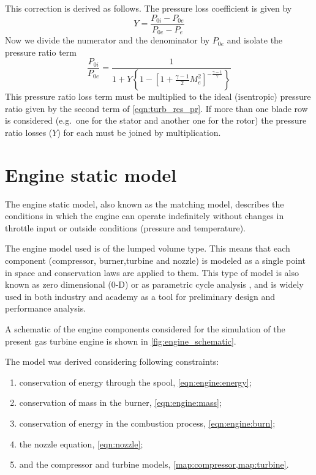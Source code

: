 This correction is derived as follows. The pressure loss coefficient is given by
\begin{equation}
    Y = \frac{P_{0i} - P_{0e}}{P_{0e} - P_e}
\end{equation}
Now we divide the numerator and the denominator by $P_{0e}$ and isolate the pressure ratio term 
\begin{equation}
    \frac{P_{0i}}{P_{0e}} = \frac{1}{1+Y\left\{1-\left[1+\tfrac{\gamma-1}{2}M_e^2\right]^{-\frac{\gamma-1}{\gamma}}\right\}}
\end{equation}
This pressure ratio loss term must be multiplied to the ideal (isentropic) pressure ratio given by the second term of \cref{eqn:turb_res_pr}. If more than one blade row is considered (e.g.\ one for the stator and another one for the rotor) the pressure ratio losses ($Y$) for each must be joined by multiplication.




\section{Engine static model}
\label{sec:model:static}

The engine static model, also known as the matching model, 
describes the conditions in which the engine can operate indefinitely 
without changes in throttle input or outside conditions (pressure and temperature).

The engine model used is of the lumped volume type. This means that each component 
 (compressor, burner,turbine and nozzle)
 is modeled as a single point in space and conservation laws are applied to them.
 This type of model is also known as zero dimensional (0-D) or as parametric cycle analysis
 ,
 and is widely used in both industry and academy as a tool for preliminary design and 
 performance analysis. 

A schematic of the engine components considered for the simulation of the present gas turbine engine is shown in \cref{fig:engine_schematic}.

The model was derived considering following constraints:

\begin{enumerate}
    \item conservation of energy through the spool, \cref{eqn:engine:energy};
    \item conservation of mass in the burner, \cref{eqn:engine:mass};
    \item conservation of energy in the combustion process, \cref{eqn:engine:burn};
    \item the nozzle equation, \cref{eqn:nozzle};
    \item and the compressor and turbine models, \cref{map:compressor,map:turbine}.
\end{enumerate}

